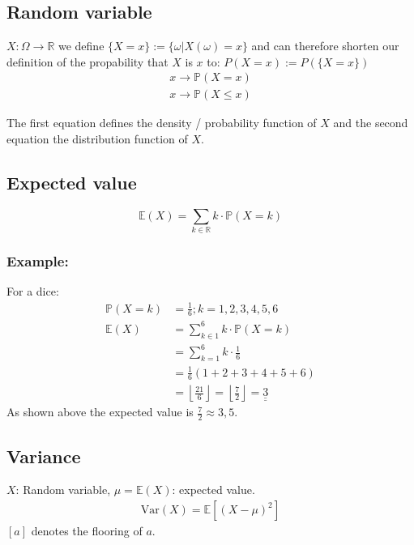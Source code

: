 \documentclass[twoside, a4paper, twocolumn]{article}
\begin{document}
    \subsection{Random variable}
    $X: \Omega \rightarrow \mathbb{R}$ we define $\{X = x\} := \{\omega |
    X(\omega) = x\}$ and can therefore shorten our definition of the
    propability that $X$ is $x$ to: $P(X = x) := P(\{X = x\})$
    \begin{eqnarray}
        x \rightarrow \mathbb{P}(X = x) \\
        x \rightarrow \mathbb{P}(X \leq x)
    \end{eqnarray}

    The first equation defines the density / probability function of $X$ and the
    second equation the distribution function of $X$.

    \subsection{Expected value}
    \begin{equation}
        \mathbb{E}(X) = \sum_{k \in \mathbb{R}}k \cdot \mathbb{P}(X = k)
    \end{equation}

    \subsubsection{Example:}
    For a dice:
    \begin{align*}
        \mathbb{P}(X = k) &= \frac{1}{6}; k = 1,2,3,4,5,6 \\
        \mathbb{E}(X) &= \sum_{k \in 1}^6 k \cdot \mathbb{P}(X = k) \\
                      &= \sum_{k = 1}^6 k \cdot \frac{1}{6} \\
                      &= \frac{1}{6} (1+2+3+4+5+6) \\
                      &= \left\lfloor\frac{21}{6}\right\rfloor =
                      \left\lfloor\frac{7}{2}\right\rfloor = \underline{\underline{3}}
    \end{align*}
    As shown above the expected value is $\frac{7}{2} \approx 3,5$.

    \subsection{Variance}
    $X$: Random variable, $\mu = \mathbb{E}(X)$: expected value.
    \begin{eqnarray}
    \textrm{Var}(X) = \mathbb{E}\left[(X - \mu)^2\right]
    \end{eqnarray}
    $\left[a\right]$ denotes the flooring of $a$.
\end{document}
